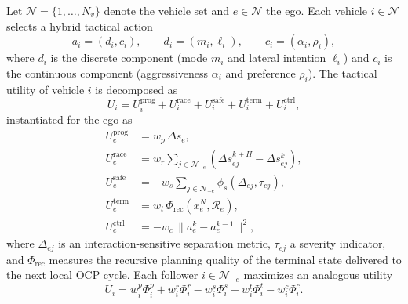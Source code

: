 \documentclass{iopjournal}
\begin{document}
Let $\mathcal{N}=\{1,\dots,N_v\}$ denote the vehicle set and $e\in\mathcal{N}$
the ego.  Each vehicle $i\in\mathcal{N}$ selects a hybrid tactical action
\begin{equation}
a_i=(d_i,c_i),\qquad d_i=(m_i,\ell_i),\qquad c_i=(\alpha_i,\rho_i),
\label{eq:hybrid_action_game}
\end{equation}
where $d_i$ is the discrete component (mode $m_i$ and lateral intention
$\ell_i$) and $c_i$ is the continuous component (aggressiveness $\alpha_i$ and
preference $\rho_i$).  The tactical utility of vehicle $i$ is decomposed as
\begin{equation}
U_i
=
U_i^{\mathrm{prog}}
+U_i^{\mathrm{race}}
+U_i^{\mathrm{safe}}
+U_i^{\mathrm{term}}
+U_i^{\mathrm{ctrl}},
\label{eq:utility_decomposition}
\end{equation}
instantiated for the ego as
\begin{align}
U_e^{\mathrm{prog}} &= w_p\,\Delta s_e,
\label{eq:ego_prog}\\
U_e^{\mathrm{race}} &= w_r\sum_{j\in\mathcal{N}_{-e}}
                      (\Delta s_{ej}^{k+H}-\Delta s_{ej}^k),
\label{eq:ego_race}\\
U_e^{\mathrm{safe}} &= -w_s\sum_{j\in\mathcal{N}_{-e}}
                      \phi_s(\Delta_{ej},\tau_{ej}),
\label{eq:ego_safe}\\
U_e^{\mathrm{term}} &= w_t\,\Phi_{\mathrm{rec}}(x_e^N,\mathcal{R}_e),
\label{eq:ego_term}\\
U_e^{\mathrm{ctrl}} &= -w_c\,\|a_e^k-a_e^{k-1}\|^2,
\label{eq:ego_ctrl}
\end{align}
where $\Delta_{ej}$ is an interaction-sensitive separation metric,
$\tau_{ej}$ a severity indicator, and
$\Phi_{\mathrm{rec}}$ measures the recursive planning quality of
the terminal state delivered to the next local OCP cycle.
Each follower $i\in\mathcal{N}_{-e}$ maximizes an analogous utility
\begin{equation}
U_i = w_i^p\Phi_i^p + w_i^r\Phi_i^r - w_i^s\Phi_i^s
      + w_i^t\Phi_i^t - w_i^c\Phi_i^c.
\label{eq:follower_utility}
\end{equation}
\end{document}
